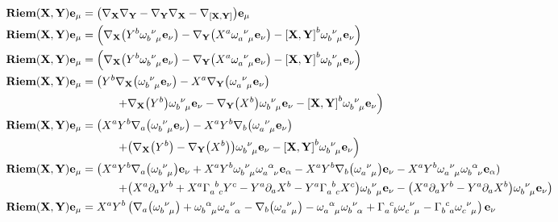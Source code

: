 \begin{align*}
    \textbf{Riem}\qty(\vb X,\vb Y)\vb e_\mu&=\qty(\nabla_{\vb X}\nabla_{\vb Y}-\nabla_{\vb Y}\nabla_{\vb X}-\nabla_{\comm{\vb X}{\vb Y}})\vb e_\mu\\
    \textbf{Riem}\qty(\vb X,\vb Y)\vb e_\mu&=\qty(\nabla_{\vb X}\qty(Y^b\tensor{\omega}{_b^\nu_\mu}\vb e_\nu)-\nabla_{\vb Y}\qty(X^a\tensor{\omega}{_a^\nu_\mu}\vb e_\nu)-\comm{\vb X}{\vb Y}^b\tensor{\omega}{_b^\nu_\mu}\vb e_\nu)\\
    \textbf{Riem}\qty(\vb X,\vb Y)\vb e_\mu&=\qty(\nabla_{\vb X}\qty(Y^b\tensor{\omega}{_b^\nu_\mu}\vb e_\nu)-\nabla_{\vb Y}\qty(X^a\tensor{\omega}{_a^\nu_\mu}\vb e_\nu)-\comm{\vb X}{\vb Y}^b\tensor{\omega}{_b^\nu_\mu}\vb e_\nu)\\
    \textbf{Riem}\qty(\vb X,\vb Y)\vb e_\mu&=\left(Y^b\nabla_{\vb X}\qty(\tensor{\omega}{_b^\nu_\mu}\vb e_\nu)-X^a\nabla_{\vb Y}\qty(\tensor{\omega}{_a^\nu_\mu}\vb e_\nu)\right.\\
    &\quad\quad\quad\left.+\nabla_{\vb X}\qty(Y^b)\tensor{\omega}{_b^\nu_\mu}\vb e_\nu-\nabla_{\vb Y}\qty(X^b)\tensor{\omega}{_b^\nu_\mu}\vb e_\nu-\comm{\vb X}{\vb Y}^b\tensor{\omega}{_b^\nu_\mu}\vb e_\nu\right)\\
    \textbf{Riem}\qty(\vb X,\vb Y)\vb e_\mu&=\left(X^aY^b\nabla_{a}\qty(\tensor{\omega}{_b^\nu_\mu}\vb e_\nu)-X^aY^b\nabla_{b}\qty(\tensor{\omega}{_a^\nu_\mu}\vb e_\nu)\right.\\
    &\quad\quad\quad\left.+\qty(\nabla_{\vb X}\qty(Y^b)-\nabla_{\vb Y}\qty(X^b))\tensor{\omega}{_b^\nu_\mu}\vb e_\nu-\comm{\vb X}{\vb Y}^b\tensor{\omega}{_b^\nu_\mu}\vb e_\nu\right)\\
    \textbf{Riem}\qty(\vb X,\vb Y)\vb e_\mu&=\left(X^aY^b\nabla_{a}\qty(\tensor{\omega}{_b^\nu_\mu})\vb e_\nu+X^aY^b\tensor{\omega}{_b^\nu_\mu}\tensor{\omega}{_a^\alpha_\nu}\vb e_\alpha-X^aY^b\nabla_{b}\qty(\tensor{\omega}{_a^\nu_\mu})\vb e_\nu-X^aY^b\tensor{\omega}{_a^\nu_\mu}\tensor{\omega}{_b^\alpha_\nu}\vb e_\alpha)\right.\\
    &\quad\quad\quad\left.+\qty(X^a\partial_a Y^b+X^a\tensor{\Gamma}{_a^b_c}Y^c-Y^a\partial_aX^b-Y^a\tensor{\Gamma}{_a^b_c}X^c)\tensor{\omega}{_b^\nu_\mu}\vb e_\nu-\qty(X^a\partial_aY^b-Y^a\partial_a X^b)\tensor{\omega}{_b^\nu_\mu}\vb e_\nu\right)\\
    \textbf{Riem}\qty(\vb X,\vb Y)\vb e_\mu&=X^aY^b\left(\nabla_{a}\qty(\tensor{\omega}{_b^\nu_\mu})+\tensor{\omega}{_b^\alpha_\mu}\tensor{\omega}{_a^\nu_\alpha}-\nabla_{b}\qty(\tensor{\omega}{_a^\nu_\mu})-\tensor{\omega}{_a^\alpha_\mu}\tensor{\omega}{_b^\nu_\alpha}+\tensor{\Gamma}{_a^c_b}\tensor{\omega}{_c^\nu_\mu}-\tensor{\Gamma}{_b^c_a}\tensor{\omega}{_c^\nu_\mu}\right)\vb e_\nu\\

\end{align*}
